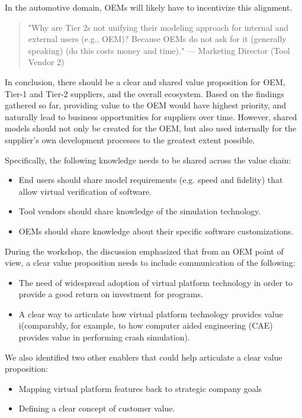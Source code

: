 In the automotive domain, OEMs will likely have to incentivize this alignment.
\begin{quote}
"Why are Tier 2s not unifying their modeling approach for internal and external users (e.g., OEM)? Because OEMs do not ask for it (generally speaking) (do this costs money and time)."
— Marketing Director (Tool Vendor 2)
\end{quote}

In conclusion, there should be a clear and shared value proposition for OEM, Tier-1 and Tier-2 suppliers, and the overall ecosystem. Based on the findings gathered so far, providing value to the OEM would have highest priority, and naturally lead to business opportunities for suppliers over time. However, shared models should not only be created for the OEM, but also used internally for the supplier’s own development processes to the greatest extent possible.

Specifically, the following knowledge needs to be shared across the value chain:
\begin{itemize}
  \item End users should share model requirements (e.g. speed and fidelity) that allow virtual verification of software.
  \item Tool vendors should share knowledge of the simulation technology.
  \item OEMs should share knowledge about their specific software customizations.
\end{itemize}

During the workshop, the discussion emphasized that from an OEM point of view, a clear value proposition needs to include communication of the following:
\begin{itemize}
\item The need of widespread adoption of virtual platform technology in order to provide a good return on investment for programs. 
\item A clear way to articulate how virtual platform technology provides value i(comparably, for example, to how computer aided engineering (CAE) provides value in performing crash simulation).
\end{itemize}

We also identified two other enablers that could help articulate a clear value proposition:
\begin{itemize}
\item Mapping virtual platform features back to strategic company goals
\item Defining a clear concept of customer value.
\end{itemize}

